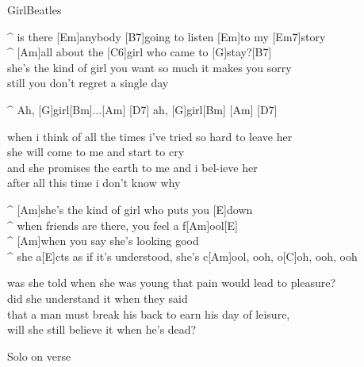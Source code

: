 \begin{song}{Girl}{Beatles}

\begin{guitar}
^ is there [Em]anybody [B7]going to listen [Em]to my [Em7]story\\
^ [Am]all about the [C6]girl who came to [G]stay?[B7]\\
she's the kind of girl you want so much it makes you sorry\\
still you don't regret a single day\\
\end{guitar}


\begin{guitar}
^ Ah, [G]girl[Bm]...[Am]   [D7]   ah, [G]girl[Bm]   [Am]   [D7]\\
\end{guitar}


\begin{guitar}
when i think of all the times i've tried so hard to leave her\\
she will come to me and start to cry\\
and she promises the earth to me and i bel-ieve her\\
after all this time i don't know why\\
\end{guitar}


\begin{guitar}
^ [Am]she's the kind of girl who puts you [E]down\\
^ when friends are there, you feel a f[Am]ool[E]\\
^ [Am]when you say she's looking good\\
^ she a[E]cts as if it's understood, she's c[Am]ool, ooh, o[C]oh, ooh, ooh\\
\end{guitar}



\begin{guitar}
was she told when she was young that pain would lead to pleasure?\\
did she understand it when they said\\
that a man must break his back to earn his day of leisure,\\
will she still believe it when he's dead?\\
\end{guitar}



\begin{guitar}
Solo on verse\\
\end{guitar}

\end{song}
